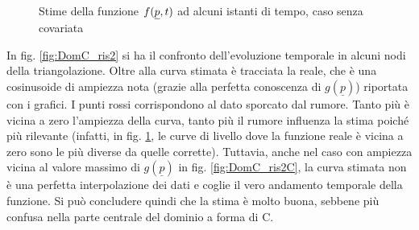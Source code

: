 \documentclass[a4paper,11pt,twoside,openright]{book}							%
\begin{document}
\begin{figure}[H]
{   }
	\caption{Stime della funzione $f(\protect\underline{p},t)$ ad alcuni istanti di tempo, caso senza covariata}
	\label{fig:DomC_ris}
\end{figure}

In fig. \ref{fig:DomC_ris2} si ha il confronto dell'evoluzione temporale in alcuni nodi della triangolazione. Oltre alla curva stimata è tracciata la reale, che è una cosinusoide di ampiezza nota (grazie alla perfetta conoscenza di $g(\underline p)$) riportata con i grafici. I punti rossi corrispondono al dato sporcato dal rumore. Tanto più è vicina a zero l'ampiezza della curva, tanto più il rumore influenza la stima poiché più rilevante (infatti, in fig. \ref{fig:DomC_ris}, le curve di livello dove la funzione reale è vicina a zero sono le più diverse da quelle corrette). Tuttavia, anche nel caso con ampiezza vicina al valore massimo di $g(\underline p)$ in fig. \ref{fig:DomC_ris2C}, la curva stimata non è una perfetta interpolazione dei dati e coglie il vero andamento temporale della funzione. Si può concludere quindi che la stima è molto buona, sebbene più confusa nella parte centrale del dominio a forma di C.
\end{document}
